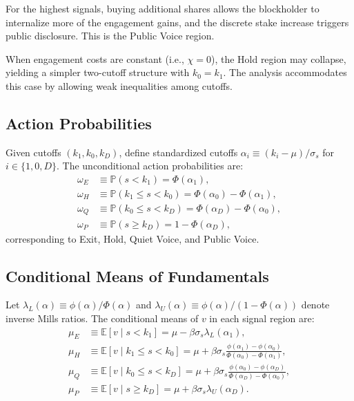\documentclass[11pt]{article}
\newcommand{\E}{\mathbb{E}}
\newcommand{\PP}{\mathbb{P}}
\newcommand{\1}{\mathbf{1}}
\begin{document}
For the highest signals, buying additional shares allows the blockholder to internalize more of the engagement gains, and the discrete stake increase triggers public disclosure. This is the Public Voice region.

When engagement costs are constant (i.e., $\chi=0$), the Hold region may collapse, yielding a simpler two-cutoff structure with $k_0=k_1$. The analysis accommodates this case by allowing weak inequalities among cutoffs.

%
\subsection{Action Probabilities}
%

Given cutoffs $(k_1, k_0, k_D)$, define standardized cutoffs $\alpha_i \equiv (k_i - \mu)/\sigma_s$ for $i \in \{1, 0, D\}$. The unconditional action probabilities are:
\begin{align*}
\omega_E &\equiv \PP(s < k_1) = \Phi(\alpha_1), \\
\omega_H &\equiv \PP(k_1 \leq s < k_0) = \Phi(\alpha_0) - \Phi(\alpha_1), \\
\omega_Q &\equiv \PP(k_0 \leq s < k_D) = \Phi(\alpha_D) - \Phi(\alpha_0), \\
\omega_P &\equiv \PP(s \geq k_D) = 1 - \Phi(\alpha_D),
\end{align*}
corresponding to Exit, Hold, Quiet Voice, and Public Voice.

%
\subsection{Conditional Means of Fundamentals}
%

Let $\lambda_L(\alpha) \equiv \phi(\alpha)/\Phi(\alpha)$ and $\lambda_U(\alpha) \equiv \phi(\alpha)/(1-\Phi(\alpha))$ denote inverse Mills ratios. The conditional means of $v$ in each signal region are:
\begin{align*}
\mu_E &\equiv \E[v \mid s < k_1] = \mu - \beta\sigma_s \lambda_L(\alpha_1), \\
\mu_H &\equiv \E[v \mid k_1 \leq s < k_0] = \mu + \beta\sigma_s \frac{\phi(\alpha_1) - \phi(\alpha_0)}{\Phi(\alpha_0) - \Phi(\alpha_1)}, \\
\mu_Q &\equiv \E[v \mid k_0 \leq s < k_D] = \mu + \beta\sigma_s \frac{\phi(\alpha_0) - \phi(\alpha_D)}{\Phi(\alpha_D) - \Phi(\alpha_0)}, \\
\mu_P &\equiv \E[v \mid s \geq k_D] = \mu + \beta\sigma_s \lambda_U(\alpha_D).
\end{align*}
\end{document}
